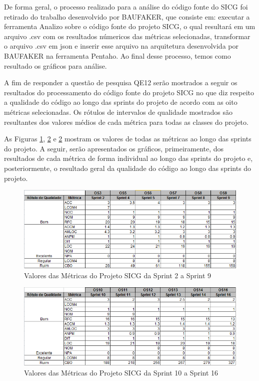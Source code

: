 De forma geral, o processo realizado para a análise do código fonte do SICG foi retirado do trabalho desenvolvido por BAUFAKER, que  consiste em: executar a ferramenta Analizo sobre o código fonte do projeto SICG, o qual resultará em um arquivo .csv com os resultados númericos das métricas selecionadas, transformar o arquivo .csv em json e inserir esse arquivo na arquitetura desenvolvida por BAUFAKER na ferramenta Pentaho. Ao final desse processo, temos como resultado os gráficos para análise. 

A fim de responder a questão de pesquisa QE12 serão mostrados a seguir os resultados do processamento do código fonte do projeto SICG no que diz respeito a qualidade do código ao longo das sprints do projeto de acordo com as oito métricas selecionadas. Os rótulos de intervalos de qualidade mostrados são resultantes dos valores médios de cada métrica para todas as classes do projeto. 

As Figuras \ref{metricasprint}, \ref{metricasprint2} e \ref{metricasprint2} mostram os valores de todas as métricas ao longo das sprints do projeto. A seguir, serão apresentados os gráficos, primeiramente, dos resultados de cada métrica de forma individual ao longo das sprints do projeto e, posteriormente, o resultado geral da qualidade do código ao longo das sprints do projeto.

\begin{figure}[H]
		\centering
			\includegraphics[scale=0.9]{figuras/metricas29.png}
		\caption{Valores das Métricas do Projeto SICG da Sprint 2 a Sprint 9}
		\label{metricasprint}
\end{figure}

\begin{figure}[H]
		\centering
			\includegraphics[scale=0.9]{figuras/metricas1016.png}
		\caption{Valores das Métricas do Projeto SICG da Sprint 10 a Sprint 16}
		\label{metricasprint2}
\end{figure}

